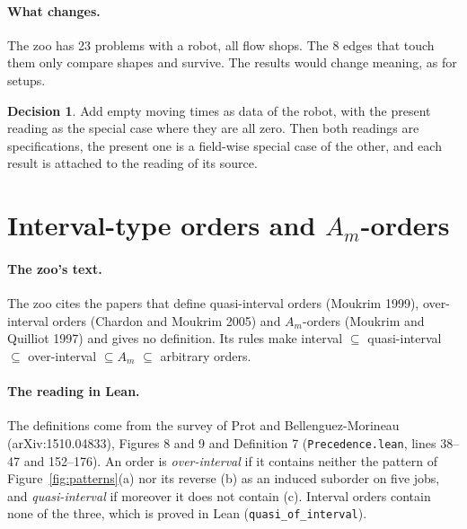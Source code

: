 \documentclass[11pt]{article}
\newcommand{\lean}[1]{\texttt{#1}}
\theoremstyle{definition}
\newtheorem{decision}{Decision}
\begin{document}
\paragraph{What changes.} The zoo has 23 problems with a robot, all flow
shops. The 8 edges that touch them only compare shapes and survive. The
results would change meaning, as for setups.

\begin{decision}
Add empty moving times as data of the robot, with the present reading as the
special case where they are all zero. Then both readings are specifications,
the present one is a field-wise special case of the other, and each result is
attached to the reading of its source.
\end{decision}

\section{Interval-type orders and \texorpdfstring{$A_m$}{A\_m}-orders}\label{sec:orders}

\paragraph{The zoo's text.} The zoo cites the papers that define
quasi-interval orders (Moukrim 1999), over-interval orders (Chardon and
Moukrim 2005) and $A_m$-orders (Moukrim and Quilliot 1997) and gives no
definition. Its rules make interval $\subseteq$ quasi-interval $\subseteq$
over-interval $\subseteq A_m$ $\subseteq$ arbitrary orders.

\paragraph{The reading in Lean.} The definitions come from the survey of Prot
and Bellenguez-Morineau (arXiv:1510.04833), Figures 8 and 9 and Definition 7
(\lean{Precedence.lean}, lines 38--47 and 152--176). An order is
\emph{over-interval} if it contains neither the pattern of
Figure~\ref{fig:patterns}(a) nor its reverse (b) as an induced suborder on five
jobs, and \emph{quasi-interval} if moreover it does not contain (c).
Interval orders contain none of the three, which is proved in Lean
(\lean{quasi\_of\_interval}).
\end{document}

